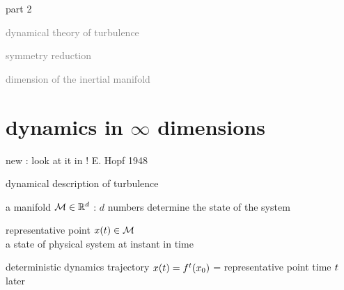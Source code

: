 \begin{frame}{part 2}
\begin{enumerate}
              \item
    \textcolor{gray}{\small
dynamical theory of turbulence
        }
              \item
    {\Large
\statesp
    }\textcolor{gray}{\small
              \item
symmetry reduction
              \item
dimension of the inertial manifold
                    }
            \end{enumerate}
\end{frame}


\section[dynamics in $\infty$ dimensions]
{dynamics in $\infty$ dimensions}

\begin{frame}{new : look at it in}
\bigskip
\hfill
{\Huge \statesp!}
\vfill
E. Hopf 1948
\end{frame}

\begin{frame}{dynamical description of turbulence}

\begin{block}{\statesp}
a manifold $\mathcal{M} \in \mathbb{R}^{d}$ :
$d$ numbers determine the state of the system
\end{block}

\bigskip

\begin{block}{representative point }
$x(t) \in \mathcal{M}$
\\
a state of physical system at instant in time
\end{block}

\bigskip

\begin{block}{deterministic dynamics}
trajectory $x(t) = {f^{t}({x_0})}$ =
representative point time $t$ later
\end{block}
\end{frame}


